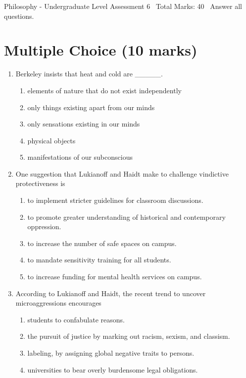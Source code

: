 \documentclass[12pt]{article}
\begin{document}
\begin{center}
Philosophy - Undergraduate Level Assessment 6 \
Total Marks: 40 \
Answer all questions.
\end{center}

\section*{Multiple Choice (10 marks)}
\begin{enumerate}[label=\arabic*.]
\item Berkeley insists that heat and cold are \_\_\_\_\_.
\begin{enumerate}[label=(\alph*)]
    \item elements of nature that do not exist independently
    \item only things existing apart from our minds
    \item only sensations existing in our minds
    \item physical objects
    \item manifestations of our subconscious
\end{enumerate}
\item One suggestion that Lukianoff and Haidt make to challenge vindictive protectiveness is
\begin{enumerate}[label=(\alph*)]
    \item to implement stricter guidelines for classroom discussions.
    \item to promote greater understanding of historical and contemporary oppression.
    \item to increase the number of safe spaces on campus.
    \item to mandate sensitivity training for all students.
    \item to increase funding for mental health services on campus.
\end{enumerate}
\item According to Lukianoff and Haidt, the recent trend to uncover microaggressions encourages
\begin{enumerate}[label=(\alph*)]
    \item students to confabulate reasons.
    \item the pursuit of justice by marking out racism, sexism, and classism.
    \item labeling, by assigning global negative traits to persons.
    \item universities to bear overly burdensome legal obligations.

\end{enumerate}
\end{enumerate}
\end{document}

